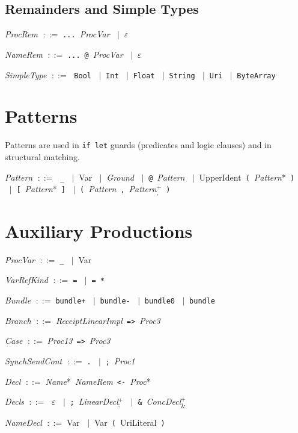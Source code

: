 \documentclass[11pt,a4paper]{article}
\newcommand{\kw}[1]{\texttt{\textcolor{kw}{#1}}}       %
\newcommand{\sym}[1]{\texttt{#1}}                       %
\newcommand{\nt}[1]{\textit{\textcolor{nt}{#1}}}        %
\newcommand{\tok}[1]{\textsf{#1}}                       %
\newcommand{\OR}{\ensuremath{\;\mid\;}}                  %
\newcommand{\EPS}{\ensuremath{\varepsilon}}              %
\newcommand{\bnfdef}{\ensuremath{\;::=\;}}               %
\newenvironment{grammar}{%
  \par\smallskip\begin{list}{}{%
    \setlength{\leftmargin}{1.5em}%
    \setlength{\itemsep}{2pt}%
    \setlength{\parsep}{0pt}}%
}{\end{list}\smallskip}
\begin{document}
\subsection{Remainders and Simple Types}

\begin{grammar}
\item \nt{ProcRem} \bnfdef \sym{...}~\nt{ProcVar} \OR \EPS
\item \nt{NameRem} \bnfdef \sym{...}~\sym{@}~\nt{ProcVar} \OR \EPS
\item \nt{SimpleType} \bnfdef
    \kw{Bool} \OR \kw{Int} \OR \kw{Float} \OR \kw{String} \OR \kw{Uri} \OR \kw{ByteArray}
\end{grammar}


\section{Patterns}
\label{sec:patterns}

Patterns are used in \kw{if}~\kw{let} guards (predicates and logic
clauses) and in structural matching.

\begin{grammar}
\item \nt{Pattern} \bnfdef
    \sym{\_}
    \OR \tok{Var}
    \OR \nt{Ground}
    \OR \sym{@}~\nt{Pattern}
    \OR \tok{UpperIdent}~\sym{(}~\nt{Pattern}*~\sym{)}
    \OR \sym{[}~\nt{Pattern}*~\sym{]}
    \OR \sym{(}~\nt{Pattern}~\sym{,}~\nt{Pattern}$^+_{\texttt{,}}$~\sym{)}
\end{grammar}


\section{Auxiliary Productions}
\label{sec:aux}

\begin{grammar}
\item \nt{ProcVar} \bnfdef \sym{\_} \OR \tok{Var}
\item \nt{VarRefKind} \bnfdef \sym{=} \OR \sym{=}~\sym{*}
\item \nt{Bundle} \bnfdef \sym{bundle+} \OR \sym{bundle-} \OR \sym{bundle0} \OR \kw{bundle}
\item \nt{Branch} \bnfdef \nt{ReceiptLinearImpl}~\sym{=>}~\nt{Proc3}
\item \nt{Case} \bnfdef \nt{Proc13}~\sym{=>}~\nt{Proc3}
\item \nt{SynchSendCont} \bnfdef \sym{.} \OR \sym{;}~\nt{Proc1}
\item \nt{Decl} \bnfdef \nt{Name}*~\nt{NameRem}~\sym{<-}~\nt{Proc}*
\item \nt{Decls} \bnfdef
    \EPS
    \OR \sym{;}~\nt{LinearDecl}$^+_{\texttt{;}}$
    \OR \sym{\&}~\nt{ConcDecl}$^+_{\texttt{\&}}$
\item \nt{NameDecl} \bnfdef \tok{Var} \OR \tok{Var}~\sym{(}~\tok{UriLiteral}~\sym{)}
\end{grammar}
\end{document}
